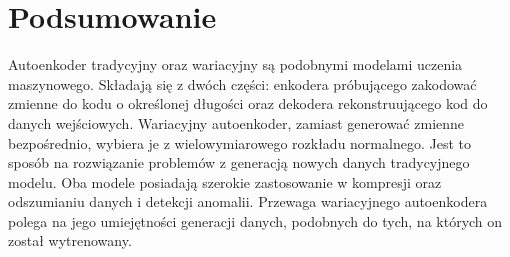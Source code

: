 \documentclass[a4paper,12pt,oneside]{book} %
\begin{document}
\chapter{Podsumowanie}
Autoenkoder tradycyjny oraz wariacyjny są podobnymi modelami uczenia maszynowego. Składają się z dwóch części: enkodera próbującego zakodować zmienne do kodu o określonej długości oraz dekodera rekonstruującego kod do danych wejściowych. Wariacyjny autoenkoder, zamiast generować zmienne bezpośrednio, wybiera je z wielowymiarowego rozkładu normalnego. Jest to sposób na rozwiązanie problemów z generacją nowych danych tradycyjnego modelu. Oba modele posiadają szerokie zastosowanie w kompresji oraz odszumianiu danych i detekcji anomalii. Przewaga wariacyjnego autoenkodera polega na jego umiejętności generacji danych, podobnych do tych, na których on został wytrenowany. 


\listoffigures{}

\listofcodes{}

%
\printbibliography[title=Bibliografia]
%
\end{document}
